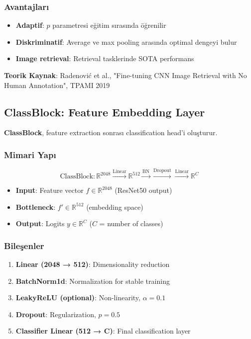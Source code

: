 \documentclass[12pt,a4paper]{article}
\begin{document}
\subsubsection{Avantajları}
\begin{itemize}
    \item \textbf{Adaptif}: $p$ parametresi eğitim sırasında öğrenilir
    \item \textbf{Diskriminatif}: Average ve max pooling arasında optimal dengeyi bulur
    \item \textbf{Image retrieval}: Retrieval tasklerinde SOTA performans
\end{itemize}

\textbf{Teorik Kaynak}: Radenović et al., "Fine-tuning CNN Image Retrieval with No Human Annotation", TPAMI 2019

\subsection{ClassBlock: Feature Embedding Layer}

\textbf{ClassBlock}, feature extraction sonrası classification head'i oluşturur.

\subsubsection{Mimari Yapı}
\begin{equation}
    \text{ClassBlock}: \mathbb{R}^{2048} \xrightarrow{\text{Linear}} \mathbb{R}^{512} \xrightarrow{\text{BN}} \xrightarrow{\text{Dropout}} \xrightarrow{\text{Linear}} \mathbb{R}^{C}
\end{equation}

\begin{itemize}
    \item \textbf{Input}: Feature vector $f \in \mathbb{R}^{2048}$ (ResNet50 output)
    \item \textbf{Bottleneck}: $f' \in \mathbb{R}^{512}$ (embedding space)
    \item \textbf{Output}: Logits $y \in \mathbb{R}^{C}$ ($C$ = number of classes)
\end{itemize}

\subsubsection{Bileşenler}
\begin{enumerate}
    \item \textbf{Linear (2048 → 512)}: Dimensionality reduction
    \item \textbf{BatchNorm1d}: Normalization for stable training
    \item \textbf{LeakyReLU (optional)}: Non-linearity, $\alpha = 0.1$
    \item \textbf{Dropout}: Regularization, $p = 0.5$
    \item \textbf{Classifier Linear (512 → C)}: Final classification layer
\end{enumerate}
\end{document}
